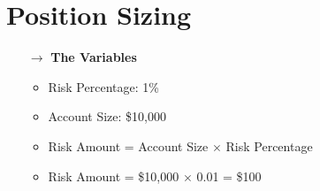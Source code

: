 \documentclass[10pt]{article}
\begin{document}
\newpage



\section*{Position Sizing}

\begin{enumerate}
    \item[$\rightarrow$] \textbf{The Variables}
    \begin{itemize}
        \item Risk Percentage: 1\%
        \item Account Size: \$10,000
        \item Risk Amount = Account Size $\times$ Risk Percentage
        \item Risk Amount = \$10,000 $\times$ 0.01 = \$100
    \end{itemize}
\vspace{0.1cm}
\end{enumerate}
    


\end{document}
